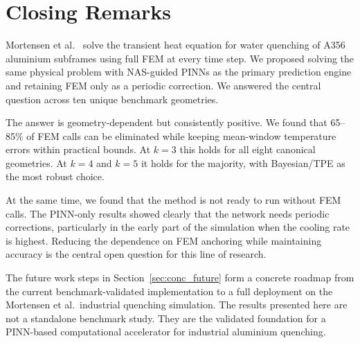 \section{Closing Remarks}
\label{sec:conc_closing}

Mortensen et al.~\cite{mortensen2026} solve the transient heat equation for
water quenching of A356 aluminium subframes using full FEM at every time step.
We proposed solving the same physical problem with NAS-guided PINNs as the
primary prediction engine and retaining FEM only as a periodic correction.
We answered the central question across ten unique benchmark geometries.

The answer is geometry-dependent but consistently positive.
We found that 65--85\% of FEM calls can be eliminated while keeping mean-window
temperature errors within practical bounds.
At $k=3$ this holds for all eight canonical geometries.
At $k=4$ and $k=5$ it holds for the majority, with Bayesian/TPE as the most
robust choice.

At the same time, we found that the method is not ready to run without FEM calls.
The PINN-only results showed clearly that the network needs periodic corrections,
particularly in the early part of the simulation when the cooling rate is highest.
Reducing the dependence on FEM anchoring while maintaining accuracy is the
central open question for this line of research.

The future work steps in Section~\ref{sec:conc_future} form a concrete roadmap
from the current benchmark-validated implementation to a full deployment on the
Mortensen et al.\ industrial quenching simulation.
The results presented here are not a standalone benchmark study.
They are the validated foundation for a PINN-based computational accelerator
for industrial aluminium quenching.
